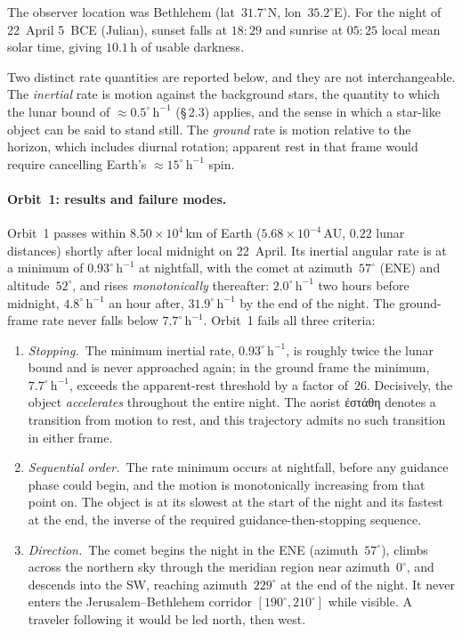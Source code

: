 \documentclass[11pt,a4paper]{article}
\newcommand{\grk}[1]{{\fontencoding{LGR}\selectfont #1}}
\newcommand{\grk}[1]{{\greekfont #1}}
\begin{document}
The observer location was Bethlehem (lat~$31.7^\circ$N, lon~$35.2^\circ$E).
For the night of 22~April 5~BCE (Julian), sunset falls at $18{:}29$ and
sunrise at $05{:}25$ local mean solar time, giving $10.1$\,h of usable
darkness.

Two distinct rate quantities are reported below, and they are not
interchangeable.  The \emph{inertial} rate is motion against the background
stars, the quantity to which the lunar bound of
${\approx}0.5^\circ\,\mathrm{h}^{-1}$ (\S\,2.3) applies, and the sense in
which a star-like object can be said to stand still.  The \emph{ground}
rate is motion relative to the horizon, which includes diurnal rotation;
apparent rest in that frame would require cancelling Earth's
${\approx}15^\circ\,\mathrm{h}^{-1}$ spin.

\paragraph{Orbit~1: results and failure modes.}
Orbit~1 passes within $8.50\times10^{4}$\,km of Earth
($5.68\times10^{-4}$\,AU, $0.22$ lunar distances) shortly after local
midnight on 22~April.  Its inertial angular rate is at a minimum of
$0.93^\circ\,\mathrm{h}^{-1}$ at nightfall, with the comet at
azimuth~$57^\circ$ (ENE) and altitude~$52^\circ$, and rises
\emph{monotonically} thereafter: $2.0^\circ\,\mathrm{h}^{-1}$ two hours
before midnight, $4.8^\circ\,\mathrm{h}^{-1}$ an hour after,
$31.9^\circ\,\mathrm{h}^{-1}$ by the end of the night.  The ground-frame
rate never falls below $7.7^\circ\,\mathrm{h}^{-1}$.  Orbit~1 fails all
three criteria:

\begin{enumerate}
  \item \textit{Stopping.}~The minimum inertial rate,
    $0.93^\circ\,\mathrm{h}^{-1}$, is roughly twice the lunar bound and is
    never approached again; in the ground frame the minimum,
    $7.7^\circ\,\mathrm{h}^{-1}$, exceeds the apparent-rest threshold by a
    factor of~$26$.  Decisively, the object \emph{accelerates} throughout
    the entire night.  The aorist \grk{ἐστάθη} denotes a transition from
    motion to rest, and this trajectory admits no such transition in either
    frame.
  \item \textit{Sequential order.}~The rate minimum occurs at nightfall,
    before any guidance phase could begin, and the motion is monotonically
    increasing from that point on.  The object is at its slowest at the
    start of the night and its fastest at the end, the inverse of the
    required guidance-then-stopping sequence.
  \item \textit{Direction.}~The comet begins the night in the ENE
    (azimuth~$57^\circ$), climbs across the northern sky through the
    meridian region near azimuth~$0^\circ$, and descends into the SW,
    reaching azimuth~$229^\circ$ at the end of the night.  It never enters
    the Jerusalem--Bethlehem corridor $[190^\circ, 210^\circ]$ while
    visible.  A traveler following it would be led north, then west.
\end{enumerate}
\end{document}
